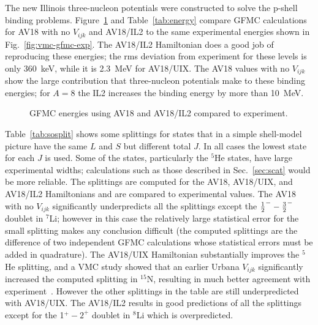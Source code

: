 The new Illinois three-nucleon potentials were constructed to solve
the p-shell binding problems.  Figure~\ref{fig:av18-il2-exp} 
and Table~\ref{tab:energy} compare
GFMC calculations for AV18 with no $V_{ijk}$ and AV18/IL2 to 
the same experimental energies shown in Fig.~\ref{fig:vmc-gfmc-exp}.
The AV18/IL2 Hamiltonian does a good job of reproducing these energies;
the rms deviation from experiment for these levels is only
360~keV, while it is 2.3~MeV for AV18/UIX.  The AV18 values with
no $V_{ijk}$ show the large contribution that three-nucleon potentials
make to these binding energies; for $A=8$ the IL2 increases the
binding energy by more than 10~MeV.

\begin{figure}
\centerline{}
\caption{GFMC energies using AV18 and AV18/IL2 compared to experiment.}
\label{fig:av18-il2-exp}
\end{figure}

Table~\ref{tab:sosplit} shows some splittings for states that in
a simple shell-model picture have the same $L$ and $S$ but different total $J$.
In all cases the lowest state for each $J$ is used.  Some of
the states, particularly the $^5$He states,  have large experimental widths;
calculations such as those described in Sec.~\ref{sec:scat} would be more
reliable.
The splittings are computed for the
AV18, AV18/UIX, and AV18/IL2 Hamiltonians and are compared to experimental
values.  The AV18 with no $V_{ijk}$ significantly underpredicts all the
splittings except the $\textstyle{1\over2}^- - \textstyle{3\over2}^-$ doublet in $^7$Li;
however in this case the relatively large statistical error for the small
splitting makes any conclusion difficult (the computed splittings are
the difference of two independent GFMC calculations whose statistical errors
must be added in quadrature).
The AV18/UIX Hamiltonian substantially improves the $^5$He splitting, and a 
VMC study showed that an earlier Urbana $V_{ijk}$  significantly increased the
computed splitting in $^{15}$N, resulting in much better agreement with
experiment~\cite{PP93}.  However the other splittings in the table are
still underpredicted with AV18/UIX.  The AV18/IL2 results in good predictions
of all the splittings except for the 1$^+-2^+$ doublet in $^8$Li which
is overpredicted.

